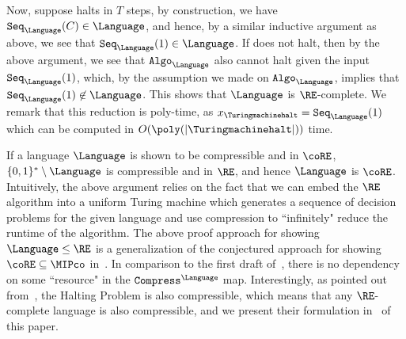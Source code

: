 Now, suppose \Turingmachinehalt halts in $T$ steps, by construction, we have  $\texttt{Seq}_{\Language}(C) \in \Language$, and hence, by a similar inductive argument as above, we see that $\texttt{Seq}_{\Language}(1) \in \Language$. If \Turingmachinehalt does not halt, then by the above argument, we see that $\texttt{Algo}_{\Language}$ also cannot halt given the input $\texttt{Seq}_{\Language}(1)$, which, by the assumption we made on $\texttt{Algo}_{\Language}$, implies that $\texttt{Seq}_{\Language}(1) \not\in \Language$. This shows that $\Language$ is $\RE$-complete. We remark that this reduction is poly-time, as $x_{\text{\Turingmachinehalt}} = \texttt{Seq}_{\Language}(1)$ which can be computed in $O(\poly(|\text{\Turingmachinehalt}|))$ time.

If a language $\Language$ is shown to be compressible and in $\coRE$, $\{0,1\}^* \setminus \Language$ is compressible and in $\RE$, and hence $\Language$ is $\coRE$. Intuitively, the above argument relies on the fact that we can embed the $\RE$ algorithm into a uniform Turing machine which generates a sequence of decision problems for the given language and use compression to ``infinitely" reduce the runtime of the algorithm. The above proof approach for showing $\Language \leq \RE$ is a generalization of the conjectured approach for showing $\coRE \subseteq \MIPco$ in~\cite[Pseudocode 4]{mousaviNonlocalGamesCompression2022}. In comparison to the first draft of~\cite{nezhadiRecursiveCompressionMethod2025}, there is no dependency on some ``resource" in the $\texttt{Compress}^{\Language}$ map. Interestingly, as pointed out from~\cite{nezhadiRecursiveCompressionMethod2025}, the Halting Problem is also compressible, which means that any $\RE$-complete language is also compressible, and we present their formulation in~ of this paper. 





